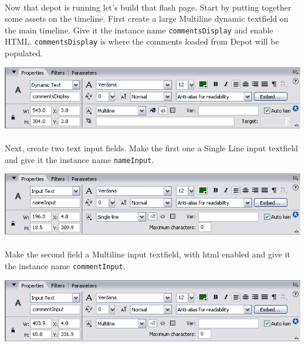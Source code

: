 \documentclass[12pt]{report}
\begin{document}
\paragraph{}
Now that depot is running let's build that flash page. Start by
putting together some assets on the timeline. First create a large
Multiline dynamic textfield on the main timeline. Give it the instance
name \texttt{commentsDisplay} and enable HTML. \texttt{commentsDisplay} 
is where the comments loaded from Depot will be populated.

\begin{center}
\includegraphics[scale=0.70]{flash-tutorial-images/usage-commentsDisplay-properties.png}
\end{center}

\paragraph{}
Next, create two text input fields. Make the first one a
Single Line input textfield and give it the instance name
\texttt{nameInput}.


\begin{center}
\includegraphics[scale=0.70]{flash-tutorial-images/usage-nameInput-properties.png}
\end{center}


\paragraph{}
Make the second field a Multiline input textfield, with html enabled
and give it the instance name \texttt{commentInput}.


\begin{center}
\includegraphics[scale=0.70]{flash-tutorial-images/usage-commentInput-properties.png}
\end{center}
\end{document}
